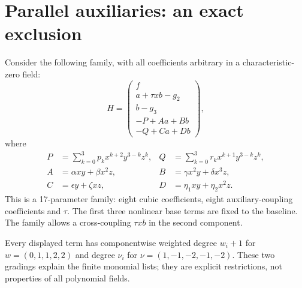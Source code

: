 \documentclass[11pt,a4paper]{article}
\theoremstyle{remark}\newtheorem{remark}[theorem]{Remark}
\begin{document}
\section{Parallel auxiliaries: an exact exclusion}\label{parallelsection}
Consider the following family, with all coefficients arbitrary in a
characteristic-zero field:
\begin{equation}\label{parallel}
H=\begin{pmatrix}
f\\ a+\tau xb-g_2\\b-g_3\\-P+Aa+Bb\\-Q+Ca+Db
\end{pmatrix},
\end{equation}
where
\begin{align}
P&=\sum_{k=0}^3p_k x^{k+2}y^{3-k}z^k, &
Q&=\sum_{k=0}^3r_k x^{k+1}y^{3-k}z^k,\\
A&=\alpha xy+\beta x^2z, &
B&=\gamma x^2y+\delta x^3z,\\
C&=\epsilon y+\zeta xz, &
D&=\eta_1xy+\eta_2x^2z.
\end{align}
This is a 17-parameter family: eight cubic coefficients, eight auxiliary-coupling
coefficients and $\tau$. The first three nonlinear base terms are fixed to the
baseline. The family allows a cross-coupling $\tau xb$ in the second component.

Every displayed term has componentwise weighted degree $w_i+1$ for
$w=(0,1,1,2,2)$ and degree $\nu_i$ for
$\nu=(1,-1,-2,-1,-2)$. These two gradings explain the finite monomial lists;
they are explicit restrictions, not properties of all polynomial fields.
\end{document}
